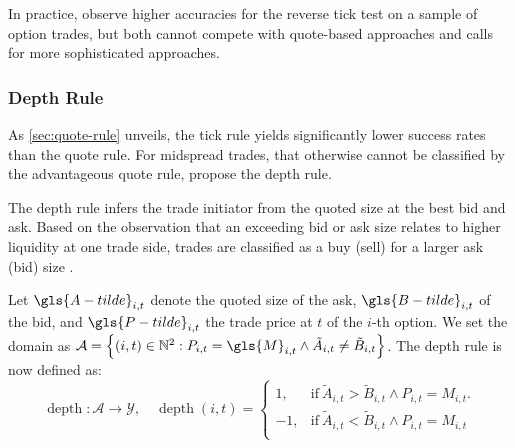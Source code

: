 In practice, \textcite[][29--32]{grauerOptionTradeClassification2022} observe higher accuracies for the reverse tick test on a sample of option trades, but both cannot compete with quote-based approaches and calls for more sophisticated approaches.

\subsubsection{Depth Rule}\label{sec:depth-rule}


As \cref{sec:quote-rule} unveils, the tick rule yields significantly lower success rates than the quote rule. For midspread trades, that otherwise cannot be classified by the advantageous quote rule, \textcite[][14]{grauerOptionTradeClassification2022} propose the depth rule.

The depth rule infers the trade initiator from the quoted size at the best bid and ask. Based on the observation that an exceeding bid or ask size relates to higher liquidity at one trade side, trades are classified as a buy (sell) for a larger ask (bid) size \autocite[][14]{grauerOptionTradeClassification2022}.

Let $\gls{A-tilde}_{i,t}$ denote the quoted size of the ask, $\gls{B-tilde}_{i,t}$ of the bid, and $\gls{P-tilde}_{i,t}$ the trade price at $t$ of the $i$-th option. We set the domain as $\mathcal{A} = \left\{(i, t) \in \mathbb{N}^2: P_{i,t} = \gls{M}_{i,t} \land \tilde{A}_{i,t} \neq \tilde{B}_{i,t} \right\}$. The depth rule is now defined as:
\begin{equation}
    \operatorname{depth} \colon \mathcal{A} \to \mathcal{Y},\quad
    \operatorname{depth}(i, t)=
    \begin{cases}
        1,  & \text{if}\ \tilde{A}_{i,t} > \tilde{B}_{i,t} \land P_{i, t} = M_{i, t}. \\
        -1, & \text{if}\ \tilde{A}_{i,t} < \tilde{B}_{i,t} \land P_{i, t} = M_{i, t}  \\
    \end{cases}
    \label{eq:depth-rule}
\end{equation}

